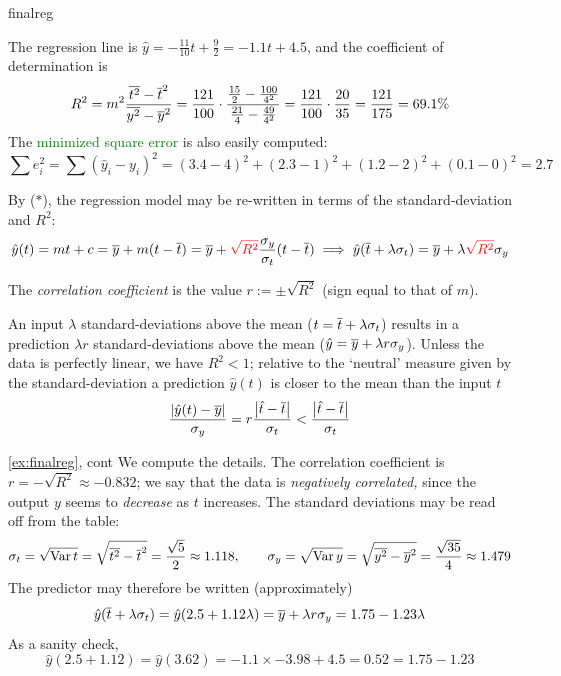 \begin{example}{}{finalreg}
\begin{minipage}[t]{0.44\linewidth}
\end{minipage}\medbreak
The regression line is $\hat y=-\frac{11}{10}t+\frac 92=-1.1t+4.5$, and the coefficient of determination is
\[
	R^2=m^2\frac{\overline{t^2}-\overline{t}^2}{\overline{y^2}-\overline{y}^2} =\frac{121}{100}\cdot \frac{\frac{15}2-\frac{100}{4^2}}{\frac{21}4-\frac{49}{4^2}}= \frac{121}{100}\cdot \frac{20}{35} =\frac{121}{175} =69.1\%
\]
The \textcolor{Green}{minimized square error} is also easily computed:
\[
	\sum e_i^2=\sum(\hat y_i-y_i)^2=(3.4-4)^2+(2.3-1)^2+(1.2-2)^2+(0.1-0)^2=2.7
\] 
\end{example}



By ($\ast$), the regression model may be re-written in terms of the standard-deviation and $R^2$: 
\[
	\hat y(t)=mt+c=\overline{y}+m(t-\overline{t}) =\overline{y}+\textcolor{red}{\sqrt{R^2}}\frac{\sigma_y}{\sigma_t}(t-\overline{t}) \implies \hat y(\overline{t}+\lambda\sigma_t)=\overline{y}+\lambda\textcolor{red}{\sqrt{R^2}}\sigma_y
\]

\begin{defn}{}{}
	The \emph{correlation coefficient} is the value $r:=\pm\sqrt{R^2}$ (sign equal to that of $m$).
\end{defn}

An input $\lambda$ standard-deviations above the mean ($t=\overline{t}+\lambda\sigma_t$) results in a prediction $\lambda r$ standard-deviations above the mean ($\hat y=\overline{y}+\lambda r\sigma_y$). Unless the data is perfectly linear, we have $R^2<1$; relative to the `neutral' measure given by the standard-deviation a prediction $\hat y(t)$ is closer to the mean than the input $t$
\[
	\frac{\left| \hat y(t)-\overline{y}\right|}{\sigma_y} =r\frac{\left| \hat t-\overline{t}\right|}{\sigma_t}
	<\frac{\left| \hat t-\overline{t}\right|}{\sigma_t}
\]




\goodbreak


\begin{example*}{\ref{ex:finalreg}, cont}{}
	We compute the details. The correlation coefficient is $r=-\sqrt{R^2}\approx -0.832$; we say that the data is \emph{negatively correlated,} since the output $y$ seems to \emph{decrease} as $t$ increases. The standard deviations may be read off from the table:
	\[
		\sigma_t=\sqrt{\operatorname{Var} t}=\sqrt{\overline{t^2}-\overline{t}^2}=\frac{\sqrt 5}2\approx 1.118,\qquad \sigma_y=\sqrt{\operatorname{Var} y}=\sqrt{\overline{y^2}-\overline{y}^2}=\frac{\sqrt{35}}4\approx 1.479
	\]
	The predictor may therefore be written (approximately)
	\[
		\hat y(\overline{t}+\lambda\sigma_t)=\hat y(2.5+1.12\lambda) =\overline{y}+\lambda r\sigma_y =1.75-1.23\lambda
	\]
	As a sanity check,
	\[
		\hat y(2.5+1.12)=\hat y(3.62)=-1.1\times -3.98+4.5=0.52 =1.75-1.23
	\]
\end{example*}


